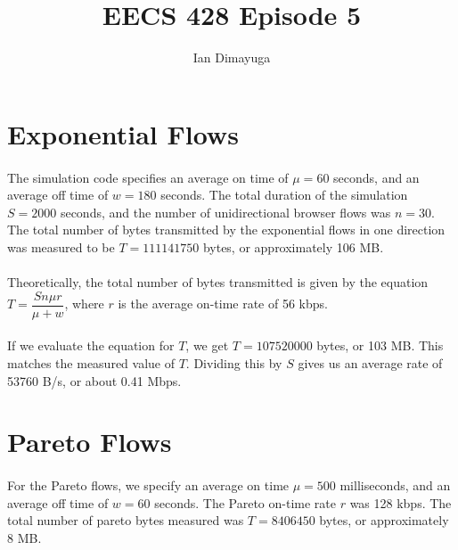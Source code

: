 \documentclass{article}
\begin{document}
  \title{EECS 428 Episode 5}
  \author{Ian Dimayuga}
  \maketitle

  \section{Exponential Flows}
    \paragraph{}
      The simulation code specifies an average on time of $\mu = 60$ seconds, and an average off time of $w = 180$ seconds.
      The total duration of the simulation $S = 2000$ seconds, and the number of unidirectional browser flows was $n = 30$.
      The total number of bytes transmitted by the exponential flows in one direction was measured to be $T = 111141750$ bytes, or approximately 106 MB.

    \paragraph{}
      Theoretically, the total number of bytes transmitted is given by the equation $T = \dfrac{S n \mu r}{\mu + w}$, where $r$ is the average on-time rate of 56 kbps.

    \paragraph{}
      If we evaluate the equation for $T$, we get $T = 107520000$ bytes, or 103 MB. This matches the measured value of $T$.
      Dividing this by $S$ gives us an average rate of 53760 B/s, or about 0.41 Mbps.

  \section{Pareto Flows}
    \paragraph{}
      For the Pareto flows, we specify an average on time $\mu = 500$ milliseconds, and an average off time of $w = 60$ seconds.
      The Pareto on-time rate $r$ was 128 kbps.
      The total number of pareto bytes measured was $T = 8406450$ bytes, or approximately 8 MB.
\end{document}
